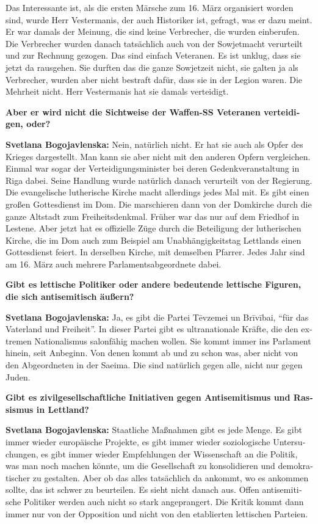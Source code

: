 \begin{otherlanguage}{ngerman}
Das Interessante ist, als die ersten Märsche zum 16. März organisiert worden sind, wurde Herr Vestermanis, der auch Historiker ist, gefragt, was er dazu meint. Er war damals der Meinung, die sind keine Verbrecher, die wurden einberufen. Die Verbrecher wurden danach tatsächlich auch von der Sowjetmacht verurteilt und zur Rechnung gezogen. Das sind einfach Veteranen. Es ist unklug, dass sie jetzt da rausgehen. Sie durften das die ganze Sowjetzeit nicht, sie galten ja als Verbrecher, wurden aber nicht bestraft dafür, dass sie in der Legion waren. Die Mehrheit nicht. Herr Vestermanis hat sie damals verteidigt.

\textbf{Aber er wird nicht die Sichtweise der Waffen-SS Veteranen verteidigen, oder?}

\textbf{Svetlana Bogojavlenska:} Nein, natürlich nicht. Er hat sie auch als Opfer des Krieges dargestellt. Man kann sie aber nicht mit den anderen Opfern vergleichen. Einmal war sogar der Verteidigungsminister bei deren Gedenkveranstaltung in Riga dabei. Seine Handlung wurde natürlich danach verurteilt von der Regierung. Die evangelische lutherische Kirche macht allerdings jedes Mal mit. Es gibt einen großen Gottesdienst im Dom. Die marschieren dann von der Domkirche durch die ganze Altstadt zum Freiheitsdenkmal. Früher war das nur auf dem Friedhof in Lestene. Aber jetzt hat es offizielle Züge durch die Beteiligung der lutherischen Kirche, die im Dom auch zum Beispiel am Unabhängigkeitstag Lettlands einen Gottesdienst feiert. In derselben Kirche, mit demselben Pfarrer. Jedes Jahr sind am 16. März auch mehrere Parlamentsabgeordnete dabei.

\textbf{Gibt es lettische Politiker oder andere bedeutende lettische Figuren, die sich antisemitisch äußern?}

\textbf{Svetlana Bogojavlenska:}  Ja, es gibt die Partei Tēvzemei un Brīvībai, “für das Vaterland und Freiheit”. In dieser Partei gibt es ultranationale Kräfte, die den extremen Nationalismus salonfähig machen wollen. Sie kommt immer ins Parlament hinein, seit Anbeginn. Von denen kommt ab und zu schon was, aber nicht von den Abgeordneten in der Saeima. Die sind natürlich gegen alle, nicht nur gegen Juden.

\textbf{Gibt es zivilgesellschaftliche Initiativen gegen Antisemitismus und Rassismus in Lettland?}

\textbf{Svetlana Bogojavlenska:}  Staatliche Maßnahmen gibt es jede Menge. Es gibt immer wieder europäische Projekte, es gibt immer wieder soziologische Untersuchungen, es gibt immer wieder Empfehlungen der Wissenschaft an die Politik, was man noch machen könnte, um die Gesellschaft zu konsolidieren und demokratischer zu gestalten. Aber ob das alles tatsächlich da ankommt, wo es ankommen sollte, das ist schwer zu beurteilen. Es sieht nicht danach aus. Offen antisemitische Politiker werden auch nicht so stark angeprangert. Die Kritik kommt dann immer nur von der Opposition und nicht von den etablierten lettischen Parteien.


\end{otherlanguage}
